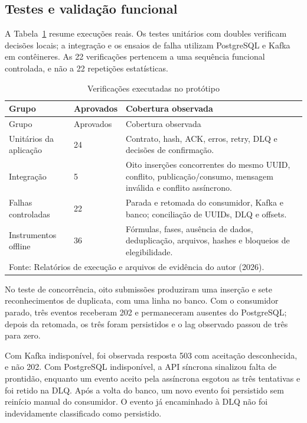 \subsection{Testes e validação funcional}
\label{sec:validacao-funcional}
A Tabela~\ref{tab:testes-executados} resume execuções reais. Os testes unitários com doubles verificam decisões locais; a integração e os ensaios de falha utilizam PostgreSQL e Kafka em contêineres. As 22 verificações pertencem a uma sequência funcional controlada, e não a 22 repetições estatísticas.

{\small
\begin{longtable}{p{}p{}p{}}
\caption{Verificações executadas no protótipo}\label{tab:testes-executados}\\
\hline Grupo & Aprovados & Cobertura observada\\ \hline
\endfirsthead
\hline Grupo & Aprovados & Cobertura observada\\ \hline
\endhead
Unitários da aplicação & 24 & Contrato, hash, ACK, erros, retry, DLQ e decisões de confirmação.\\ \hline
Integração & 5 & Oito inserções concorrentes do mesmo UUID, conflito, publicação/consumo, mensagem inválida e conflito assíncrono.\\ \hline
Falhas controladas & 22 & Parada e retomada do consumidor, Kafka e banco; conciliação de UUIDs, DLQ e offsets.\\ \hline
Instrumentos offline & 36 & Fórmulas, fases, ausência de dados, deduplicação, arquivos, hashes e bloqueios de elegibilidade.\\ \hline
\multicolumn{3}{l}{\footnotesize Fonte: Relatórios de execução e arquivos de evidência do autor (2026).}
\end{longtable}
}

No teste de concorrência, oito submissões produziram uma inserção e sete reconhecimentos de duplicata, com uma linha no banco. Com o consumidor parado, três eventos receberam 202 e permaneceram ausentes do PostgreSQL; depois da retomada, os três foram persistidos e o lag observado passou de três para zero.

Com Kafka indisponível, foi observada resposta 503 com aceitação desconhecida, e não 202. Com PostgreSQL indisponível, a API síncrona sinalizou falta de prontidão, enquanto um evento aceito pela assíncrona esgotou as três tentativas e foi retido na DLQ. Após a volta do banco, um novo evento foi persistido sem reinício manual do consumidor. O evento já encaminhado à DLQ não foi indevidamente classificado como persistido.

